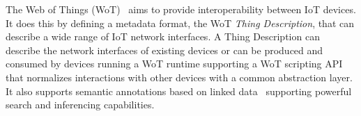 The Web of Things (WoT)~\cite{Wot2017arch} aims to provide interoperability between IoT devices.
It does this by defining a metadata format,
the WoT \emph{Thing Description}, that can describe 
a wide range of IoT network interfaces.
A Thing Description can describe the network interfaces of existing devices
or can be produced and consumed by devices running a WoT runtime supporting a WoT scripting
API that normalizes interactions with other devices with a common abstraction layer.
It also supports semantic annotations based on linked data~\cite{linkeddata2011} supporting
powerful search and inferencing capabilities.
